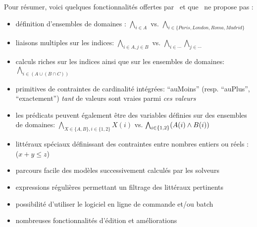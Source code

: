 Pour résumer, voici quelques fonctionnalités offertes par \nameTool\ et que \satoulouse\ ne propose pas :
\begin{itemize}
\item définition d'ensembles de domaines : $\bigwedge_{i\in A}$ vs. $\bigwedge_{i\in\{Paris,London,Roma,Madrid\}}$
\item liaisons multiples sur les indices: $\bigwedge_{i\in A,j\in B}$ vs. $\bigwedge_{i\in \cdots} \bigwedge_{j\in \cdots}$
\item calculs riches sur les indices ainsi que sur les ensembles de domaines: $\bigwedge_{i\in (A\cup (B \cap C))}$
\item primitives de contraintes de cardinalité intégrées: ``auMoins'' (resp. ``auPlus'', ``exactement'') \emph{tant} de valeurs sont vraies parmi \emph{ces valeurs}
\item les prédicats peuvent également être des variables définies sur des ensembles de domaines: $\bigwedge_{X\in \{A,B\},i\in \{1,2\}} X(i)$ vs. $\bigwedge_{i\in \{1,2\}} (A(i)\wedge B(i))$
\item littéraux spéciaux définissant des contraintes entre nombres entiers ou réels : ($x+y\leq z$)
\item parcours facile des modèles successivement calculés par les solveurs
\item expressions régulières permettant un filtrage des littéraux pertinents
\item possibilité d'utiliser le logiciel en ligne de commande et/ou batch
\item nombreuses fonctionnalités d'édition et améliorations
\end{itemize}
